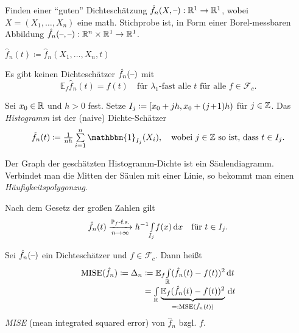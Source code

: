 \documentclass{cheat-sheet}
\renewcommand{\P}{\mathbb{P}} %
\newcommand{\E}{\mathbb{E}} %
\newcommand{\ind}{\mathbbm{1}} %
\DeclareMathOperator{\MISE}{MISE} %
\DeclareMathOperator{\MSE}{MSE} %
\begin{document}
\begin{ziel}
  Finden einer "`guten"' Dichteschätzung $\hat{f}_n(X, \text{--}) : \mathbb{R}^1 \to \mathbb{R}^1$, wobei $X = (X_1, \ldots, X_n)$ eine math. Stichprobe ist, in Form einer Borel-messbaren Abbildung $\hat{f}_n(\text{--}, \text{--}) : \mathbb{R}^n \times \mathbb{R}^1 \to \mathbb{R}^1$.
\end{ziel}

\begin{nota}
  $\hat{f}_n(t) \coloneqq \hat{f}_n(X_1, \ldots, X_n, t)$
\end{nota}

\begin{lem}
  Es gibt keinen Dichteschätzer $\hat{f}_n(\text{--})$ mit
  \[
    \E_f \hat{f}_n(t) = f(t) \quad
    \text{für $\lambda_1$-fast alle $t$ für alle $f \in \mathcal{F}_c$.}
  \]
\end{lem}


\begin{defn}
  Sei $x_0 \in \mathbb{R}$ und $h > 0$ fest.
  Setze $I_j \coloneqq \left[ x_0 + jh, x_0 + (j\!+\!1) h \right)$ für $j \in \mathbb{Z}$.
  Das \emph{Histogramm} ist der (naive) Dichte-Schätzer
  \[
    \hat{f}_n(t) \coloneqq \tfrac{1}{nh} \sum_{i=1}^n \ind_{I_j}(X_i), \quad
    \text{wobei $j \in \Z$ so ist, dass $t \in I_j$}.
  \]
\end{defn}

\begin{bem}
  Der Graph der geschätzten Histogramm-Dichte ist ein Säulendiagramm.
  Verbindet man die Mitten der Säulen mit einer Linie, so bekommt man einen \emph{Häufigkeitspolygonzug}.
\end{bem}

\begin{bem}
  Nach dem Gesetz der großen Zahlen gilt
  \[
    \hat{f}_n(t) \xra[n \to \infty]{\text{$\P_f$-f.s.}}
    h^{-1} \Int{I_j}{}{f(x)}{x} \quad
    \text{für $t \in I_j$.}
  \]
\end{bem}

\begin{defn}
  Sei $\hat{f}_n(\text{--})$ ein Dichteschätzer und $f \in \mathcal{F}_c$.
  Dann heißt
  \begin{align*}
    \MISE(\hat{f}_n) \coloneqq \Delta_n & \coloneqq \E_f \Int{\R}{}{(\hat{f}_n(t) - f(t))^2}{t} \\[-4pt]
    & = \Int{\R}{}{\underbrace{\E_f (\hat{f}_n(t) - f(t))^2}_{=: \MSE(\hat{f}_n(t))}}{t}
  \end{align*}
  \emph{MISE} (mean integrated squared error) von $\hat{f}_n$ bzgl. $f$.
\end{defn}
\end{document}
